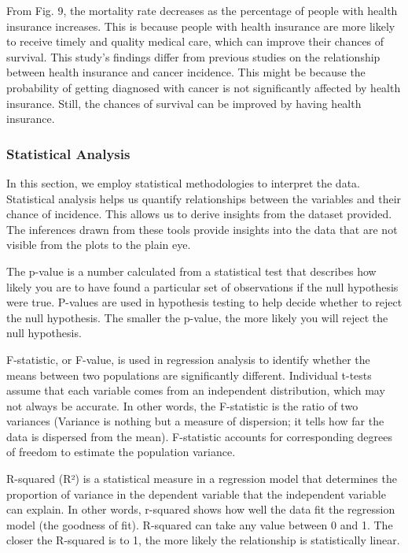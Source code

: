 \documentclass[conference]{IEEEtran}
\begin{document}
From Fig. 9, the mortality rate decreases as the percentage of people with health insurance increases. This is because people with health insurance are more likely to receive timely and quality medical care, which can improve their chances of survival. This study's findings differ from previous studies on the relationship between health insurance and cancer incidence. This might be because the probability of getting diagnosed with cancer is not significantly affected by health insurance. Still, the chances of survival can be improved by having health insurance.

\subsubsection{Statistical Analysis}
In this section, we employ statistical methodologies to interpret the data. Statistical analysis helps us quantify relationships between the variables and their chance of incidence. This allows us to derive insights from the dataset provided. The inferences drawn from these tools provide insights into the data that are not visible from the plots to the plain eye.

The p-value is a number calculated from a statistical test that describes how likely you are to have found a particular set of observations if the null hypothesis were true. P-values are used in hypothesis testing to help decide whether to reject the null hypothesis. The smaller the p-value, the more likely you will reject the null hypothesis.

F-statistic, or F-value, is used in regression analysis to identify whether the means between two populations are significantly different. Individual t-tests assume that each variable comes from an independent distribution, which may not always be accurate. In other words, the F-statistic is the ratio of two variances (Variance is nothing but a measure of dispersion; it tells how far the data is dispersed from the mean). F-statistic accounts for corresponding degrees of freedom to estimate the population variance.

R-squared (R²) is a statistical measure in a regression model that determines the proportion of variance in the dependent variable that the independent variable can explain. In other words, r-squared shows how well the data fit the regression model (the goodness of fit). R-squared can take any value between 0 and 1. The closer the R-squared is to 1, the more likely the relationship is statistically linear. 
\end{document}
